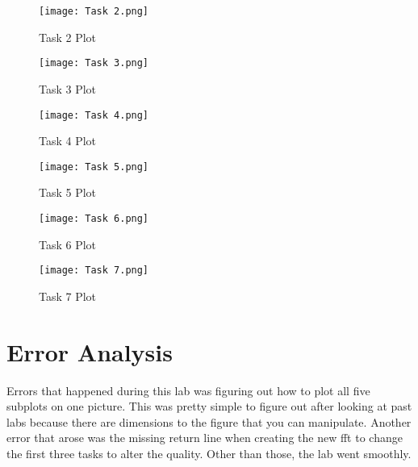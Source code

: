 \documentclass[12pt]{report}
\begin{document}
\begin{figure}[ht]
\begin{center}
\texttt{[image: Task 2.png]}
\caption{Task 2 Plot}
\end{center}
\end{figure}

\begin{figure}[ht]
\begin{center}
\texttt{[image: Task 3.png]}
\caption{Task 3 Plot}
\end{center}
\end{figure}

\begin{figure}[ht]
\begin{center}
\texttt{[image: Task 4.png]}
\caption{Task 4 Plot}
\end{center}
\end{figure}

\begin{figure}[ht]
\begin{center}
\texttt{[image: Task 5.png]}
\caption{Task 5 Plot}
\end{center}
\end{figure}

\begin{figure}[ht]
\begin{center}
\texttt{[image: Task 6.png]}
\caption{Task 6 Plot}
\end{center}
\end{figure}

\begin{figure}[ht]
\begin{center}
\texttt{[image: Task 7.png]}
\caption{Task 7 Plot}
\end{center}
\end{figure}

\clearpage

\section{Error Analysis}
Errors that happened during this lab was figuring out how to plot all five subplots on one picture. This was pretty simple to figure out after looking at past labs because there are dimensions to the figure that you can manipulate. Another error that arose was the missing return line when creating the new fft to change the first three tasks to alter the quality. Other than those, the lab went smoothly. 
\end{document}
